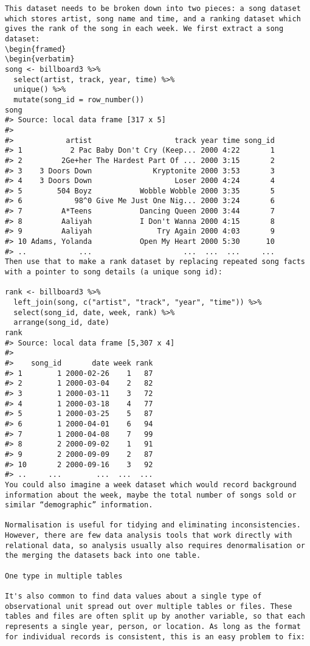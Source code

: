 \begin{framed}
\begin{verbatim}
This dataset needs to be broken down into two pieces: a song dataset which stores artist, song name and time, and a ranking dataset which gives the rank of the song in each week. We first extract a song dataset:
\begin{framed}
\begin{verbatim}
song <- billboard3 %>% 
  select(artist, track, year, time) %>%
  unique() %>%
  mutate(song_id = row_number())
song
#> Source: local data frame [317 x 5]
#> 
#>            artist                   track year time song_id
#> 1           2 Pac Baby Don't Cry (Keep... 2000 4:22       1
#> 2         2Ge+her The Hardest Part Of ... 2000 3:15       2
#> 3    3 Doors Down              Kryptonite 2000 3:53       3
#> 4    3 Doors Down                   Loser 2000 4:24       4
#> 5        504 Boyz           Wobble Wobble 2000 3:35       5
#> 6            98^0 Give Me Just One Nig... 2000 3:24       6
#> 7         A*Teens           Dancing Queen 2000 3:44       7
#> 8         Aaliyah           I Don't Wanna 2000 4:15       8
#> 9         Aaliyah               Try Again 2000 4:03       9
#> 10 Adams, Yolanda           Open My Heart 2000 5:30      10
#> ..            ...                     ...  ...  ...     ...
Then use that to make a rank dataset by replacing repeated song facts with a pointer to song details (a unique song id):

rank <- billboard3 %>%
  left_join(song, c("artist", "track", "year", "time")) %>%
  select(song_id, date, week, rank) %>%
  arrange(song_id, date)
rank
#> Source: local data frame [5,307 x 4]
#> 
#>    song_id       date week rank
#> 1        1 2000-02-26    1   87
#> 2        1 2000-03-04    2   82
#> 3        1 2000-03-11    3   72
#> 4        1 2000-03-18    4   77
#> 5        1 2000-03-25    5   87
#> 6        1 2000-04-01    6   94
#> 7        1 2000-04-08    7   99
#> 8        2 2000-09-02    1   91
#> 9        2 2000-09-09    2   87
#> 10       2 2000-09-16    3   92
#> ..     ...        ...  ...  ...
You could also imagine a week dataset which would record background information about the week, maybe the total number of songs sold or similar “demographic” information.

Normalisation is useful for tidying and eliminating inconsistencies. However, there are few data analysis tools that work directly with relational data, so analysis usually also requires denormalisation or the merging the datasets back into one table.

One type in multiple tables

It's also common to find data values about a single type of observational unit spread out over multiple tables or files. These tables and files are often split up by another variable, so that each represents a single year, person, or location. As long as the format for individual records is consistent, this is an easy problem to fix:


\end{verbatim}
\end{framed}
